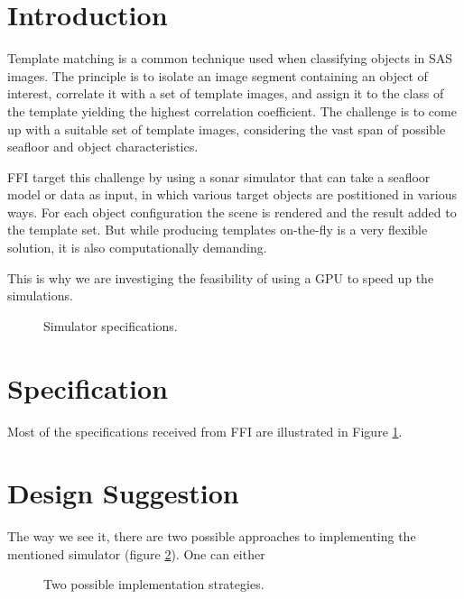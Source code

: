 \documentclass[
   article                                      %
 , 12pt                                         %
 , xelatex                                      %
 , bibtex                                       %
 , layout
]{common/mytemplate}
\begin{document}
\clearpage
\pagestyle{fancy}


\section{Introduction}

Template matching is a common technique used when classifying objects in SAS images. The principle is to isolate an image segment containing an object of interest, correlate it with a set of template images, and assign it to the class of the template yielding the highest correlation coefficient. The challenge is to come up with a suitable set of template images, considering the vast span of possible seafloor and object characteristics.

FFI target this challenge by using a sonar simulator that can take a seafloor model or data as input, in which various target objects are postitioned in various ways. For each object configuration the scene is rendered and the result added to the template set. But while producing templates on-the-fly is a very flexible solution, it is also computationally demanding.

This is why we are investiging the feasibility of using a GPU to speed up the simulations.

\begin{figure}[b]
\caption{Simulator specifications.}\label{specs}
\end{figure}

\section{Specification}

Most of the specifications received from FFI are illustrated in Figure \ref{specs}. 


\section{Design Suggestion}

The way we see it, there are two possible approaches to implementing the mentioned simulator (figure \ref{implementation}). One can either

\begin{figure}[b]
\begin{narrow}{-2.5cm}{-2.5cm}
\end{narrow}
\caption{Two possible implementation strategies.}\label{implementation}
\end{figure}
\end{document}
